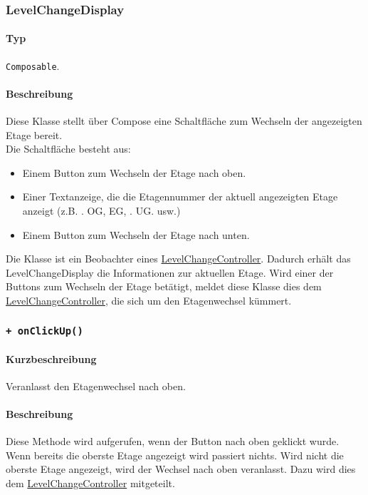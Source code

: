 \subsubsection{LevelChangeDisplay}\label{App_Map_View_LevelChangeDisplay}
\paragraph*{Typ}
\texttt{Composable}.
\paragraph*{Beschreibung}
Diese Klasse stellt über Compose eine Schaltfläche zum Wechseln der angezeigten Etage bereit.\\
Die Schaltfläche besteht aus:
\begin{itemize}
    \item Einem Button zum Wechseln der Etage nach oben.
    \item Einer Textanzeige, die die Etagennummer der aktuell angezeigten Etage anzeigt 
    (z.B. . OG\dq, \dq EG\dq, . UG\dq. usw.)
    \item Einem Button zum Wechseln der Etage nach unten.
\end{itemize}
Die Klasse ist ein Beobachter eines \hyperref[App_Map_ViewModel_LevelChangeController]{LevelChangeController}. Dadurch erhält das 
LevelChangeDisplay die Informationen zur aktuellen Etage. Wird einer der Buttons zum 
Wechseln der Etage betätigt, meldet diese Klasse dies dem \hyperref[App_Map_ViewModel_LevelChangeController]{LevelChangeController}, 
die sich um den Etagenwechsel kümmert.

\subsubsection*{\texttt{+ onClickUp()}}%
\paragraph*{Kurzbeschreibung}
Veranlasst den Etagenwechsel nach oben.
\paragraph*{Beschreibung}
Diese Methode wird aufgerufen, wenn der Button nach oben geklickt wurde. \\
Wenn bereits die oberste Etage angezeigt wird passiert nichts. 
Wird nicht die oberste Etage angezeigt, wird der Wechsel nach oben veranlasst.
Dazu wird dies dem \hyperref[App_Map_ViewModel_LevelChangeController]{LevelChangeController} mitgeteilt.
